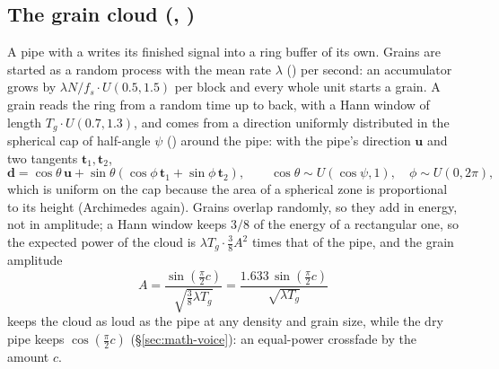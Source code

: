 \subsection{The grain cloud (, )}
\label{sec:math-cloud}
A pipe with a  writes its finished signal into a ring buffer of its own. Grains are started as a random
process with the mean rate $\lambda$ () per second: an accumulator grows by $\lambda N/f_s\cdot U(0.5,1.5)$
per block and every whole unit starts a grain. A grain reads the ring from a random time up to  back,
with a Hann window of length $T_g\cdot U(0.7,1.3)$, and comes from a direction uniformly distributed in the spherical cap
of half-angle $\psi$ () around the pipe: with the pipe's direction $\mathbf u$ and two tangents
$\mathbf t_1, \mathbf t_2$,
\begin{equation}
  \mathbf d = \cos\theta\,\mathbf u + \sin\theta(\cos\phi\,\mathbf t_1 + \sin\phi\,\mathbf t_2),\qquad
  \cos\theta \sim U(\cos\psi, 1),\quad \phi\sim U(0,2\pi),
\end{equation}
which is uniform on the cap because the area of a spherical zone is proportional to its height (Archimedes again).
Grains overlap randomly, so they add in energy, not in amplitude; a Hann window keeps $3/8$ of the energy of a
rectangular one, so the expected power of the cloud is $\lambda T_g\cdot\tfrac38 A^2$ times that of the pipe, and the
grain amplitude
\begin{equation}
  A = \frac{\sin(\tfrac\pi2 c)}{\sqrt{\tfrac38\lambda T_g}} = \frac{1.633\,\sin(\tfrac\pi2c)}{\sqrt{\lambda T_g}}
\end{equation}
keeps the cloud as loud as the pipe at any density and grain size, while the dry pipe keeps $\cos(\tfrac\pi2c)$
(\S\ref{sec:math-voice}): an equal-power crossfade by the amount $c$.


